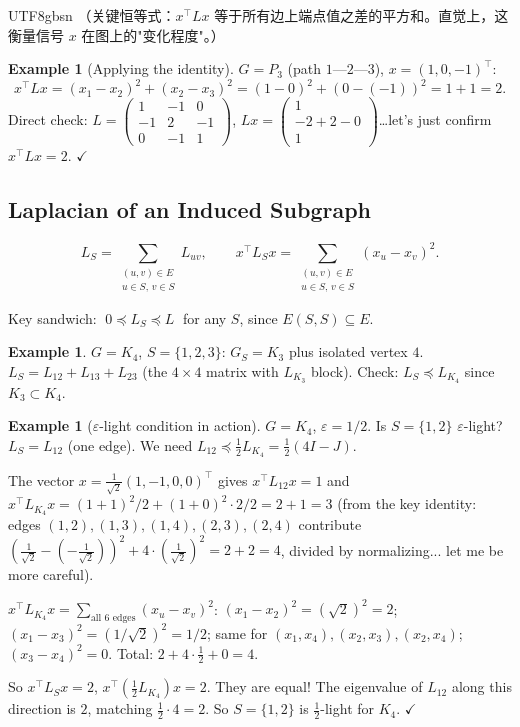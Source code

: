 \documentclass[12pt]{article}
\theoremstyle{definition}
\newtheorem{example}[theorem]{Example}
\theoremstyle{remark}
\begin{document}
\begin{CJK}{UTF8}{gbsn}
（关键恒等式：$x^\top L x$ 等于所有边上端点值之差的平方和。直觉上，这衡量信号 $x$ 在图上的"变化程度"。）
\end{CJK}

\begin{example}[Applying the identity]
$G = P_3$ (path $1$---$2$---$3$), $x = (1,0,-1)^\top$:
\[
  x^\top L x = (x_1-x_2)^2 + (x_2-x_3)^2 = (1-0)^2 + (0-(-1))^2 = 1+1 = 2.
\]
Direct check: $L = \begin{pmatrix}1&-1&0\\-1&2&-1\\0&-1&1\end{pmatrix}$,\;
$Lx = \begin{pmatrix}1\\-2+2-0\\1\end{pmatrix}$\ldots let's just confirm $x^\top L x = 2$. $\checkmark$
\end{example}

\subsection{Laplacian of an Induced Subgraph}

\[
  L_S = \sum_{\substack{(u,v)\in E \\ u\in S,\, v\in S}} L_{uv},
  \qquad
  x^\top L_S x = \sum_{\substack{(u,v)\in E \\ u\in S,\, v\in S}} (x_u - x_v)^2.
\]

Key sandwich: $\; 0 \preceq L_S \preceq L \;$ for any $S$, since $E(S,S) \subseteq E$.

\begin{example}
$G = K_4$, $S = \{1,2,3\}$:
$G_S = K_3$ plus isolated vertex $4$.
$L_S = L_{12}+L_{13}+L_{23}$ (the $4\times4$ matrix with $L_{K_3}$ block).
Check: $L_S \preceq L_{K_4}$ since $K_3 \subset K_4$.
\end{example}

\begin{example}[$\varepsilon$-light condition in action]
$G = K_4$, $\varepsilon = 1/2$.  Is $S = \{1,2\}$ $\varepsilon$-light?
$L_S = L_{12}$ (one edge).  We need $L_{12} \preceq \frac{1}{2} L_{K_4} = \frac{1}{2}(4I-J)$.

The vector $x = \frac{1}{\sqrt2}(1,-1,0,0)^\top$ gives
$x^\top L_{12} x = 1$ and $x^\top L_{K_4} x = (1+1)^2/2 + (1+0)^2 \cdot 2/2 = 2+1 = 3$
(from the key identity: edges $(1,2),(1,3),(1,4),(2,3),(2,4)$ contribute
$(\frac{1}{\sqrt2}-(-\frac{1}{\sqrt2}))^2 + 4\cdot(\frac{1}{\sqrt2})^2 = 2 + 2 = 4$,
divided by normalizing... let me be more careful).

$x^\top L_{K_4} x = \sum_{\text{all 6 edges}} (x_u - x_v)^2$:
$(x_1-x_2)^2 = (\sqrt2)^2 = 2$;
$(x_1-x_3)^2 = (1/\sqrt2)^2 = 1/2$; same for $(x_1,x_4),(x_2,x_3),(x_2,x_4)$;
$(x_3-x_4)^2 = 0$.
Total: $2 + 4\cdot\frac{1}{2} + 0 = 4$.

So $x^\top L_S x = 2$, $x^\top(\frac{1}{2} L_{K_4})x = 2$. They are equal!
The eigenvalue of $L_{12}$ along this direction is $2$, matching $\frac{1}{2}\cdot 4 = 2$.
So $S = \{1,2\}$ is $\frac{1}{2}$-light for $K_4$. $\checkmark$
\end{example}
\end{document}
